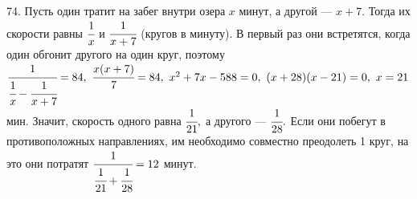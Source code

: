 74. Пусть один тратит на забег внутри озера $x$ минут, а другой --- $x+7.$ Тогда их скорости равны $\cfrac{1}{x}$ и $\cfrac{1}{x+7}$ (кругов в минуту). В первый раз они встретятся, когда один обгонит другого на один круг, поэтому $\cfrac{1}{\cfrac{1}{x}-\cfrac{1}{x+7}}=84,\ \cfrac{x(x+7)}{7}=84,\
x^2+7x-588=0,\ (x+28)(x-21)=0,\ x=21$мин. Значит, скорость одного равна $\cfrac{1}{21},$ а другого --- $\cfrac{1}{28}.$ Если они побегут в противоположных направлениях, им  необходимо совместно преодолеть 1 круг, на это они потратят $\cfrac{1}{\cfrac{1}{21}+\cfrac{1}{28}}=12$ минут.\\
